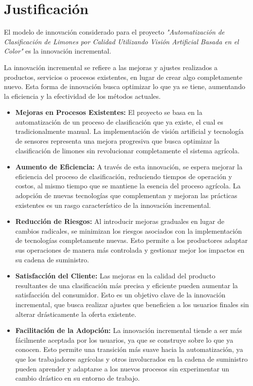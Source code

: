 \section{Justificación}

El modelo de innovación considerado para el proyecto \textit{"Automatización de Clasificación de Limones por Calidad Utilizando Visión Artificial Basada en el Color"} es la innovación incremental. 

La innovación incremental se refiere a las mejoras y ajustes realizados a productos, servicios o procesos existentes, en lugar de crear algo completamente nuevo. Esta forma de innovación busca optimizar lo que ya se tiene, aumentando la eficiencia y la efectividad de los métodos actuales.

\begin{itemize}
    \item \textbf{Mejoras en Procesos Existentes:} El proyecto se basa en la automatización de un proceso de clasificación que ya existe, el cual es tradicionalmente manual. La implementación de visión artificial y tecnología de sensores representa una mejora progresiva que busca optimizar la clasificación de limones sin revolucionar completamente el sistema agrícola.
    
    \item \textbf{Aumento de Eficiencia:} A través de esta innovación, se espera mejorar la eficiencia del proceso de clasificación, reduciendo tiempos de operación y costos, al mismo tiempo que se mantiene la esencia del proceso agrícola. La adopción de nuevas tecnologías que complementan y mejoran las prácticas existentes es un rasgo característico de la innovación incremental.
    
    \item \textbf{Reducción de Riesgos:} Al introducir mejoras graduales en lugar de cambios radicales, se minimizan los riesgos asociados con la implementación de tecnologías completamente nuevas. Esto permite a los productores adaptar sus operaciones de manera más controlada y gestionar mejor los impactos en su cadena de suministro.
    
    \item \textbf{Satisfacción del Cliente:} Las mejoras en la calidad del producto resultantes de una clasificación más precisa y eficiente pueden aumentar la satisfacción del consumidor. Esto es un objetivo clave de la innovación incremental, que busca realizar ajustes que beneficien a los usuarios finales sin alterar drásticamente la oferta existente.
    
    \item \textbf{Facilitación de la Adopción:} La innovación incremental tiende a ser más fácilmente aceptada por los usuarios, ya que se construye sobre lo que ya conocen. Esto permite una transición más suave hacia la automatización, ya que los trabajadores agrícolas y otros involucrados en la cadena de suministro pueden aprender y adaptarse a los nuevos procesos sin experimentar un cambio drástico en su entorno de trabajo.
\end{itemize}
